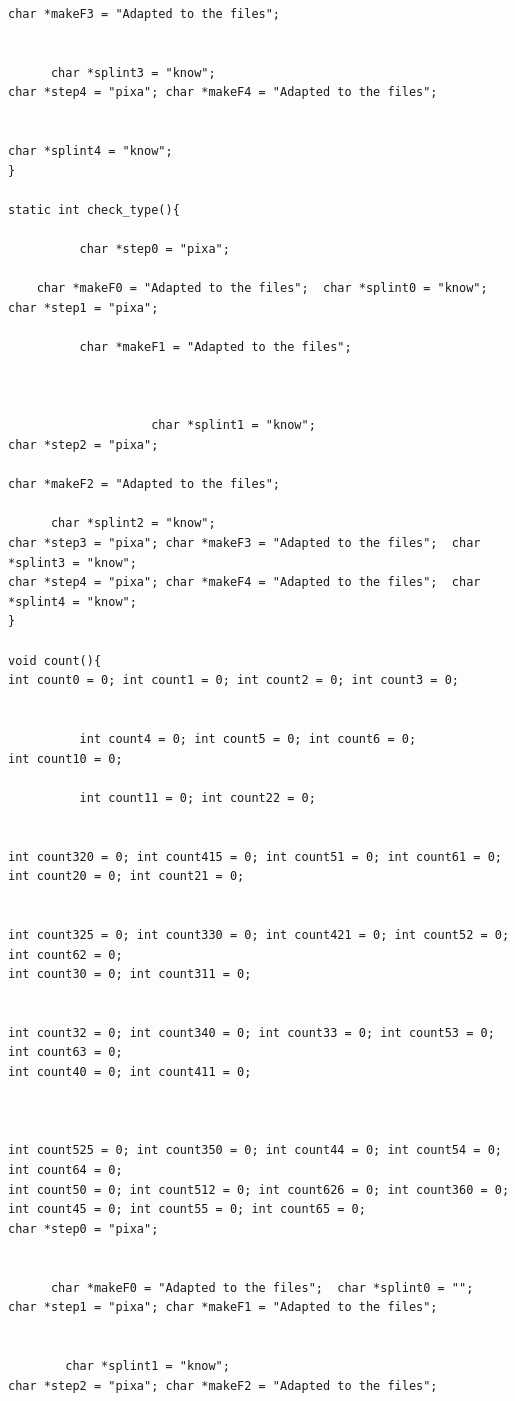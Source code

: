 \documentclass[10pt]{beamer}
\begin{document}
\begin{lstlisting}[style=CStyle]
char *makeF3 = "Adapted to the files";  


      char *splint3 = "know"; 
char *step4 = "pixa"; char *makeF4 = "Adapted to the files";  


char *splint4 = "know"; 
}

static int check_type(){

          char *step0 = "pixa";
          
    char *makeF0 = "Adapted to the files";  char *splint0 = "know"; 
char *step1 = "pixa"; 

          char *makeF1 = "Adapted to the files";  
          
          
          
                    char *splint1 = "know"; 
char *step2 = "pixa"; 

char *makeF2 = "Adapted to the files";  

      char *splint2 = "know"; 
char *step3 = "pixa"; char *makeF3 = "Adapted to the files";  char *splint3 = "know"; 
char *step4 = "pixa"; char *makeF4 = "Adapted to the files";  char *splint4 = "know"; 
}

void count(){
int count0 = 0; int count1 = 0; int count2 = 0; int count3 = 0; 


          int count4 = 0; int count5 = 0; int count6 = 0;
int count10 = 0; 

          int count11 = 0; int count22 = 0; 


int count320 = 0; int count415 = 0; int count51 = 0; int count61 = 0;
int count20 = 0; int count21 = 0; 


int count325 = 0; int count330 = 0; int count421 = 0; int count52 = 0; int count62 = 0;
int count30 = 0; int count311 = 0;


int count32 = 0; int count340 = 0; int count33 = 0; int count53 = 0; int count63 = 0;
int count40 = 0; int count411 = 0; 



int count525 = 0; int count350 = 0; int count44 = 0; int count54 = 0; int count64 = 0;
int count50 = 0; int count512 = 0; int count626 = 0; int count360 = 0; int count45 = 0; int count55 = 0; int count65 = 0;
char *step0 = "pixa"; 


      char *makeF0 = "Adapted to the files";  char *splint0 = ""; 
char *step1 = "pixa"; char *makeF1 = "Adapted to the files"; 


        char *splint1 = "know"; 
char *step2 = "pixa"; char *makeF2 = "Adapted to the files";  




\end{lstlisting}
\end{document}

